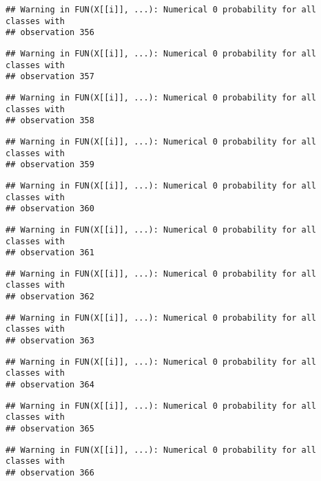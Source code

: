 \documentclass[
]{article}
\begin{document}
\begin{verbatim}
## Warning in FUN(X[[i]], ...): Numerical 0 probability for all classes with
## observation 356
\end{verbatim}

\begin{verbatim}
## Warning in FUN(X[[i]], ...): Numerical 0 probability for all classes with
## observation 357
\end{verbatim}

\begin{verbatim}
## Warning in FUN(X[[i]], ...): Numerical 0 probability for all classes with
## observation 358
\end{verbatim}

\begin{verbatim}
## Warning in FUN(X[[i]], ...): Numerical 0 probability for all classes with
## observation 359
\end{verbatim}

\begin{verbatim}
## Warning in FUN(X[[i]], ...): Numerical 0 probability for all classes with
## observation 360
\end{verbatim}

\begin{verbatim}
## Warning in FUN(X[[i]], ...): Numerical 0 probability for all classes with
## observation 361
\end{verbatim}

\begin{verbatim}
## Warning in FUN(X[[i]], ...): Numerical 0 probability for all classes with
## observation 362
\end{verbatim}

\begin{verbatim}
## Warning in FUN(X[[i]], ...): Numerical 0 probability for all classes with
## observation 363
\end{verbatim}

\begin{verbatim}
## Warning in FUN(X[[i]], ...): Numerical 0 probability for all classes with
## observation 364
\end{verbatim}

\begin{verbatim}
## Warning in FUN(X[[i]], ...): Numerical 0 probability for all classes with
## observation 365
\end{verbatim}

\begin{verbatim}
## Warning in FUN(X[[i]], ...): Numerical 0 probability for all classes with
## observation 366
\end{verbatim}
\end{document}
